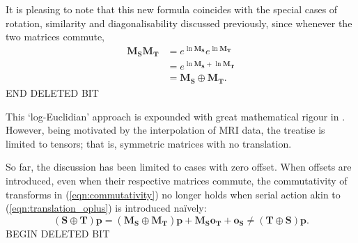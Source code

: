         It is pleasing to note that this new formula coincides with the special cases of rotation, similarity and diagonalisability discussed previously, since whenever the two matrices commute,
        \begin{equation}
            \begin{split}
                \mathbf{M_SM_T} &= e^{\ln\mathbf{M_S}}e^{\ln\mathbf{M_T}} \\
                                &= e^{\ln\mathbf{M_S} + \ln\mathbf{M_T}} \\
                                &= \mathbf{M_S} \oplus \mathbf{M_T}.
            \end{split}
        \end{equation}
END DELETED BIT

        This `log-Euclidian' approach is expounded with great mathematical rigour in \cite{Arsigny2005}. However, being motivated by the interpolation of MRI data, the treatise is limited to tensors; that is, symmetric matrices with no translation.
        
		    So far, the discussion has been limited to cases with zero offset. When offsets are introduced, even when their respective matrices commute, the commutativity of transforms in (\ref{eqn:commutativity}) no longer holds when serial action akin to (\ref{eqn:translation_oplus}) is introduced na\"ively:
        \begin{equation}
          (\mathbf{S} \oplus \mathbf{T})\mathbf{p} = (\mathbf{M_S} \oplus \mathbf{M_T})\mathbf{p} + \mathbf{M_So_T} + \mathbf{o_S} \ne (\mathbf{T} \oplus \mathbf{S})\mathbf{p}.
        \end{equation}
        BEGIN DELETED BIT

